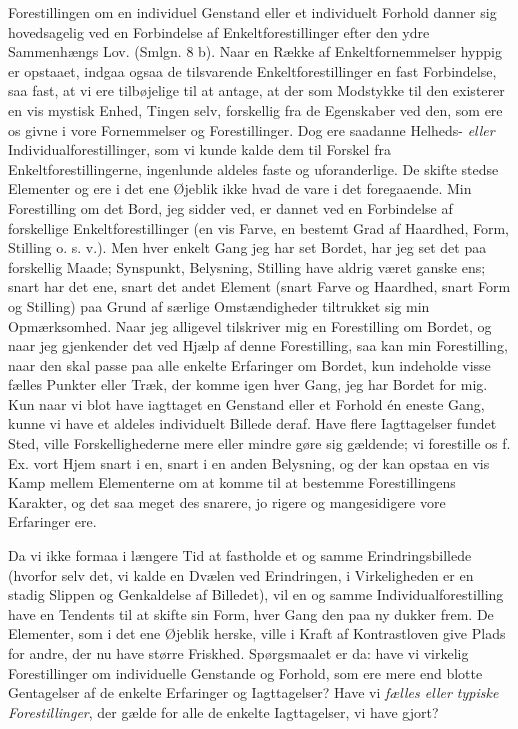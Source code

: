 \documentclass[12pt,a4paper,openany]{book}
\newcommand{\opage}[1]{\marginnote{\footnotesize\textit{[#1]}}}
\begin{document}
\opage{200}Forestillingen om en individuel Genstand eller et individuelt
Forhold danner sig hovedsagelig ved en Forbindelse af
Enkeltforestillinger efter den ydre Sammenhængs Lov. (Smlgn. 8 b). Naar
en Række af Enkeltfornemmelser hyppig er opstaaet, indgaa ogsaa de
tilsvarende Enkeltforestillinger en fast Forbindelse, saa fast, at vi
ere tilbøjelige til at antage, at der som Modstykke til den existerer en
vis mystisk Enhed, Tingen selv, forskellig fra de Egenskaber ved den,
som ere os givne i vore Fornemmelser og Forestillinger. Dog ere saadanne
Helheds- \emph{eller} Individualforestillinger, som vi kunde kalde dem
til Forskel fra Enkeltforestillingerne, ingenlunde aldeles faste og
uforanderlige. De skifte stedse Elementer og ere i det ene Øjeblik ikke
hvad de vare i det foregaaende. Min Forestilling om det Bord, jeg sidder
ved, er dannet ved en Forbindelse af forskellige Enkeltforestillinger
(en vis Farve, en bestemt Grad af Haardhed, Form, Stilling o. s. v.).
Men hver enkelt Gang jeg har set Bordet, har jeg set det paa forskellig
Maade; Synspunkt, Belysning, Stilling have aldrig været ganske ens;
snart har det ene, snart det andet Element (snart Farve og Haardhed,
snart Form og Stilling) paa Grund af særlige Omstændigheder tiltrukket
sig min Opmærksomhed. Naar jeg alligevel tilskriver mig en Forestilling
om Bordet, og naar jeg gjenkender det ved Hjælp af denne Forestilling,
saa kan min Forestilling, naar den skal passe paa alle enkelte
Erfaringer om Bordet, kun indeholde visse fælles Punkter eller Træk, der
komme igen hver Gang, jeg har Bordet for mig. Kun naar vi blot have
iagttaget en Genstand eller et Forhold én eneste Gang, kunne vi have et
aldeles individuelt Billede deraf. Have flere Iagttagelser fundet Sted,
ville Forskellighederne mere eller mindre gøre sig gældende; vi
forestille os f. Ex. vort Hjem snart i en, snart i en anden Belysning,
og der kan opstaa en vis Kamp mellem Elementerne om at komme til at
bestemme Forestillingens Karakter, og det saa meget des snarere, jo
rigere og mangesidigere vore Erfaringer ere.

Da vi ikke formaa i længere Tid at fastholde et og samme
Erindringsbillede (hvorfor selv det, vi kalde en Dvælen ved Erindringen,
i Virkeligheden er en stadig Slippen og Genkaldelse af Billedet), vil en
og samme Individualforestilling
\opage{201}have en Tendents til at skifte sin Form, hver Gang den paa ny
dukker frem. De Elementer, som i det ene Øjeblik herske, ville i Kraft
af Kontrastloven give Plads for andre, der nu have større Friskhed.
Spørgsmaalet er da: have vi virkelig Forestillinger om individuelle
Genstande og Forhold, som ere mere end blotte Gentagelser af de enkelte
Erfaringer og Iagttagelser? Have vi \emph{fælles eller typiske
Forestillinger}, der gælde for alle de enkelte Iagttagelser, vi have
gjort?
\end{document}
